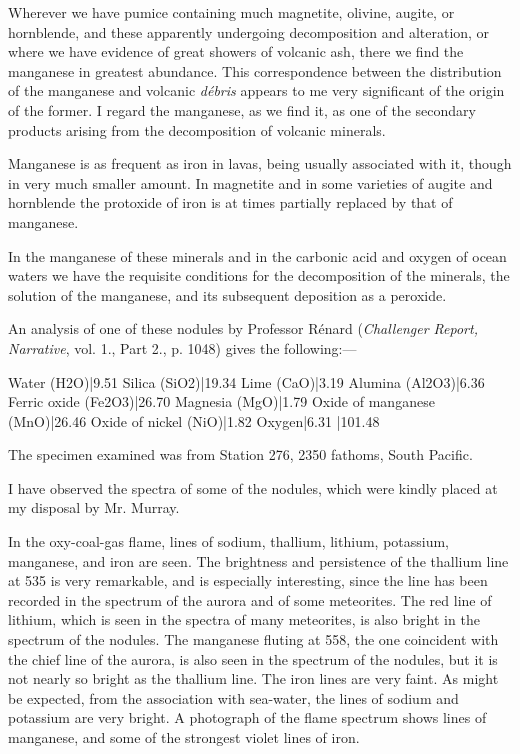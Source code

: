\documentclass[a4paper, 12pt, oneside, polutonikogreek, english]{article}
\begin{document}
Wherever we have pumice containing much magnetite, olivine, augite, or hornblende, and these apparently undergoing decomposition and alteration, or where we have evidence of great showers of volcanic ash, there we find the manganese in greatest abundance. This correspondence between the distribution of the manganese and volcanic \emph{débris} appears to me very significant of the origin of the former. I regard the manganese, as we find it, as one of the secondary products arising from the decomposition of volcanic minerals.

Manganese is as frequent as iron in lavas, being usually associated with it, though in very much smaller amount. In magnetite and in some varieties of augite and hornblende the protoxide of iron is at times partially replaced by that of manganese.

In the manganese of these minerals and in the carbonic acid and oxygen of ocean waters we have the requisite conditions for the decomposition of the minerals, the solution of the manganese, and its subsequent deposition as a peroxide.

An analysis of one of these nodules by Professor Rénard (\emph{Challenger Report, Narrative}, vol. 1., Part 2., p. 1048) gives the following:---

Water (H2O)|9.51 
Silica (SiO2)|19.34 
Lime (CaO)|3.19 
Alumina (Al2O3)|6.36 
Ferric oxide (Fe2O3)|26.70 
Magnesia (MgO)|1.79 
Oxide of manganese (MnO)|26.46 
Oxide of nickel (NiO)|1.82 
Oxygen|6.31 
|101.48 

The specimen examined was from Station 276, 2350 fathoms, South Pacific.

I have observed the spectra of some of the nodules, which were kindly placed at my disposal by Mr. Murray.

In the oxy-coal-gas flame, lines of sodium, thallium, lithium, potassium, manganese, and iron are seen. The brightness and persistence of the thallium line at 535 is very remarkable, and is especially interesting, since the line has been recorded in the spectrum of the aurora and of some meteorites. The red line of lithium, which is seen in the spectra of many meteorites, is also bright in the spectrum of the nodules. The manganese fluting at 558, the one coincident with the chief line of the aurora, is also seen in the spectrum of the nodules, but it is not nearly so bright as the thallium line. The iron lines are very faint. As might be expected, from the association with sea-water, the lines of sodium and potassium are very bright. A photograph of the flame spectrum shows lines of manganese, and some of the strongest violet lines of iron.
\end{document}
